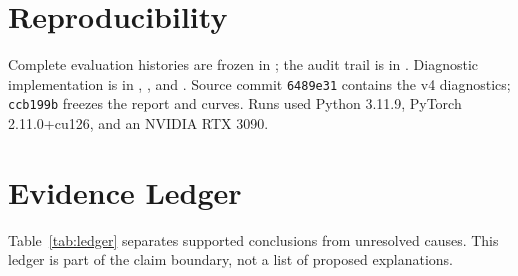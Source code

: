 \documentclass[10pt,twocolumn]{article}
\begin{document}
\section*{Reproducibility}

\begingroup\raggedright
Complete evaluation histories are frozen in
; the audit trail is in
. Diagnostic implementation is in
, , and
. Source commit \texttt{6489e31} contains the v4
diagnostics; \texttt{ccb199b} freezes the report and curves. Runs used Python
3.11.9, PyTorch 2.11.0+cu126, and an NVIDIA RTX 3090.
\par\endgroup




\appendix
\section{Evidence Ledger}

Table~\ref{tab:ledger} separates supported conclusions from unresolved causes.
This ledger is part of the claim boundary, not a list of proposed explanations.
\end{document}
